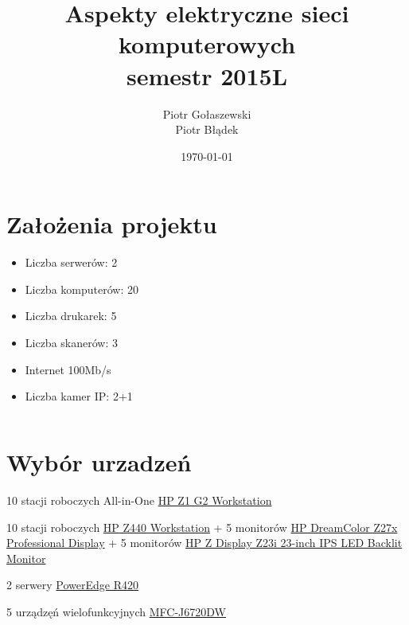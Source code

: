 \documentclass[a4paper,11pt,notitlepage]{article}
\author{Piotr Gołaszewski\\Piotr Błądek}
\title{Aspekty elektryczne sieci komputerowych  \\ {\small semestr 2015L}}
\date{\today}
\begin{document}
\maketitle
\tableofcontents

\section{Założenia projektu}
\begin{itemize}
\item Liczba serwerów: 2
\item Liczba komputerów: 20
\item Liczba drukarek: 5
\item Liczba skanerów: 3
\item Internet 100Mb/s
\item Liczba kamer IP: 2+1
\end{itemize}
\footnotesize\begin{verbatim}

\end{verbatim}\normalsize


\section{Wybór urzadzeń}
10 stacji roboczych All-in-One \href{http://shopping1.hp.com/is-bin/INTERSHOP.enfinity/WFS/WW-USSMBPublicStore-Site/en_US/-/USD/ViewProductDetail-Start;sid=EdslNTBvFJl4NWScnSU6vOhgw9UdRPUOEn0=?ProductUUID=qScQ7EN5jIQAAAFGe7gRfFIt&CatalogCategoryID=8cUQ7habRx4AAAFC71ItkXvl}{HP Z1 G2 Workstation}

10 stacji roboczych \href{http://shopping1.hp.com/is-bin/INTERSHOP.enfinity/WFS/WW-USSMBPublicStore-Site/en_US/-/USD/ViewProductDetail-Start?ProductUUID=9fQQ7EN5H7EAAAFI.yhFN.5n&CatalogCategoryID=5.AQ7habqlAAAAFIePcSIVXz&JumpTo=OfferList}{HP Z440 Workstation} + 5 monitorów \href{http://shopping1.hp.com/is-bin/INTERSHOP.enfinity/WFS/WW-USSMBPublicStore-Site/en_US/-/USD/ViewProductDetail-Start?ProductUUID=bTUQ7EN5Wv0AAAFEhvZzaeOv&CatalogCategoryID=yP4Q7EN5.w0AAAEu6fw.zwd2}{HP DreamColor Z27x Professional Display} + 5 monitorów \href{http://shopping1.hp.com/is-bin/INTERSHOP.enfinity/WFS/WW-USSMBPublicStore-Site/en_US/-/USD/ViewProductDetail-Start?ProductUUID=V2wQ7EN5vpEAAAE_HTVevaOf&CatalogCategoryID=yP4Q7EN5.w0AAAEu6fw.zwd2}{HP Z Display Z23i 23-inch IPS LED Backlit Monitor} 

2 serwery \href{http://configure.us.dell.com/dellstore/config.aspx?oc=becte4&model_id=poweredge-r420&c=us&l=en&s=bsd&cs=04}{PowerEdge R420}

5 urządzęń wielofunkcyjnych \href{http://www.brother-usa.com/MFC/ModelDetail/4/MFCJ6720DW/spec}{MFC-J6720DW}
\end{document}
